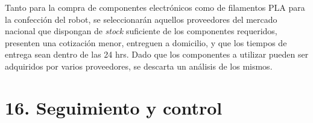 \documentclass[11pt]{charter}
\begin{document}
Tanto para la compra de componentes electrónicos  como de filamentos PLA para la confección del robot, se seleccionarán aquellos proveedores del mercado nacional que dispongan de \textit{stock} suficiente de los componentes requeridos, presenten una cotización menor, entreguen a domicilio, y que los tiempos de entrega sean dentro de las 24 hrs. Dado que los componentes a utilizar pueden ser adquiridos por varios proveedores, se descarta un análisis de los mismos.

\vspace{200mm}

\section{16. Seguimiento y control}
\label{sec:seguimiento}

%
%
%
\end{document}
